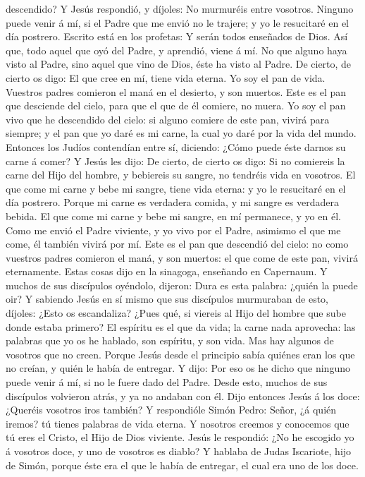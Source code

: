 descendido?  Y Jesús respondió, y díjoles: No murmuréis
entre vosotros.  Ninguno puede venir á mí, si el Padre
que me envió no le trajere; y yo le resucitaré en el día postrero.
 Escrito está en los profetas: Y serán todos enseñados de
Dios. Así que, todo aquel que oyó del Padre, y aprendió, viene á mí.
 No que alguno haya visto al Padre, sino aquel que vino
de Dios, éste ha visto al Padre.  De cierto, de cierto os
digo: El que cree en mí, tiene vida eterna.  Yo soy el
pan de vida.  Vuestros padres comieron el maná en el
desierto, y son muertos.  Este es el pan que desciende
del cielo, para que el que de él comiere, no muera.  Yo
soy el pan vivo que he descendido del cielo: si alguno comiere de este
pan, vivirá para siempre; y el pan que yo daré es mi carne, la cual yo
daré por la vida del mundo.  Entonces los Judíos
contendían entre sí, diciendo: ¿Cómo puede éste darnos su carne á comer?
 Y Jesús les dijo: De cierto, de cierto os digo: Si no
comiereis la carne del Hijo del hombre, y bebiereis su sangre, no
tendréis vida en vosotros.  El que come mi carne y bebe
mi sangre, tiene vida eterna: y yo le resucitaré en el día postrero.
 Porque mi carne es verdadera comida, y mi sangre es
verdadera bebida.  El que come mi carne y bebe mi sangre,
en mí permanece, y yo en él.  Como me envió el Padre
viviente, y yo vivo por el Padre, asimismo el que me come, él también
vivirá por mí.  Este es el pan que descendió del cielo:
no como vuestros padres comieron el maná, y son muertos: el que come de
este pan, vivirá eternamente.  Estas cosas dijo en la
sinagoga, enseñando en Capernaum.  Y muchos de sus
discípulos oyéndolo, dijeron: Dura es esta palabra: ¿quién la puede oir?
 Y sabiendo Jesús en sí mismo que sus discípulos
murmuraban de esto, díjoles: ¿Esto os escandaliza?  ¿Pues
qué, si viereis al Hijo del hombre que sube donde estaba primero?
 El espíritu es el que da vida; la carne nada aprovecha:
las palabras que yo os he hablado, son espíritu, y son vida.
 Mas hay algunos de vosotros que no creen. Porque Jesús
desde el principio sabía quiénes eran los que no creían, y quién le
había de entregar.  Y dijo: Por eso os he dicho que
ninguno puede venir á mí, si no le fuere dado del Padre. 
Desde esto, muchos de sus discípulos volvieron atrás, y ya no andaban
con él.  Dijo entonces Jesús á los doce: ¿Queréis
vosotros iros también?  Y respondióle Simón Pedro: Señor,
¿á quién iremos? tú tienes palabras de vida eterna.  Y
nosotros creemos y conocemos que tú eres el Cristo, el Hijo de Dios
viviente.  Jesús le respondió: ¿No he escogido yo á
vosotros doce, y uno de vosotros es diablo?  Y hablaba de
Judas Iscariote, hijo de Simón, porque éste era el que le había de
entregar, el cual era uno de los doce.


